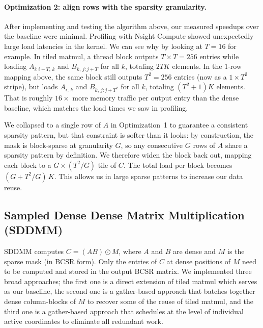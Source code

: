 \documentclass[11pt]{article}
\begin{document}
\paragraph{Optimization 2: align rows with the sparsity granularity.}
After implementing and testing the algorithm above, our measured speedups over the baseline were minimal. Profiling with Nsight Compute showed unexpectedly large load latencies in the kernel. We can see why by looking at $T = 16$ for example. In tiled matmul, a thread block outputs $T \times T = 256$ entries while loading $A_{i:i+T,\, k}$ and $B_{k,\, j:j+T}$ for all $k$, totaling $2TK$ elements. In the $1$-row mapping above, the same block still outputs $T^2 = 256$ entries (now as a $1 \times T^2$ stripe), but loads $A_{i,\, k}$ and $B_{k,\, j:j+T^2}$ for all $k$, totaling $(T^2 + 1)K$ elements. That is roughly \emph{$16\times$} more memory traffic per output entry than the dense baseline, which matches the load times we saw in profiling.

We collapsed to a single row of $A$ in Optimization~1 to guarantee a consistent sparsity pattern, but that constraint is softer than it looks: by construction, the mask is block-sparse at granularity $G$, so any consecutive $G$ rows of $A$ share a sparsity pattern by definition. We therefore widen the block back out, mapping each block to a $G \times (T^2/G)$ tile of $C$. The total load per block becomes $(G + T^2/G)\,K$. This allows us in large sparse patterns to increase our data reuse.

\subsection*{Sampled Dense Dense Matrix Multiplication (SDDMM)}
SDDMM computes $C = (AB) \odot M$, where $A$ and $B$ are dense and $M$ is the sparse mask (in BCSR form). Only the entries of $C$ at dense positions of $M$ need to be computed and stored in the output BCSR matrix. We implemented three broad approaches; the first one is a direct extension of tiled matmul which serves as our baseline, the second one is a gather-based approach that batches together dense column-blocks of $M$ to recover some of the reuse of tiled matmul, and the third one is a gather-based approach that schedules at the level of individual active coordinates to eliminate all redundant work.
\end{document}
